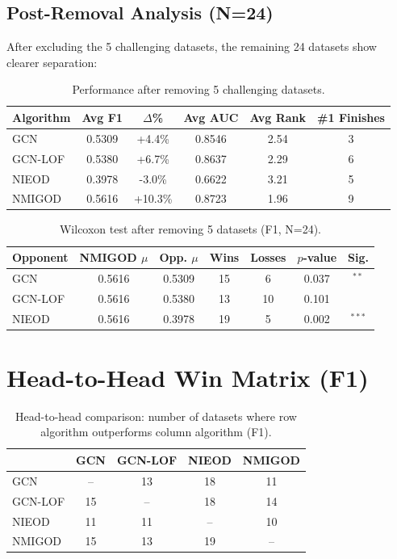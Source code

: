 \documentclass[11pt,a4paper]{article}
\begin{document}
\subsection{Post-Removal Analysis (N=24)}
After excluding the 5 challenging datasets, the remaining 24 datasets show clearer separation:
\begin{table}[H]\centering\caption{Performance after removing 5 challenging datasets.}\label{tab:filtered}\small
\begin{tabular}{lccccc}
\toprule
Algorithm & Avg F1 & $\Delta$\% & Avg AUC & Avg Rank & \#1 Finishes \\
\midrule
GCN & 0.5309 & +4.4\% & 0.8546 & 2.54 & 3 \\
GCN-LOF & 0.5380 & +6.7\% & 0.8637 & 2.29 & 6 \\
NIEOD & 0.3978 & -3.0\% & 0.6622 & 3.21 & 5 \\
NMIGOD & 0.5616 & +10.3\% & 0.8723 & 1.96 & 9 \\
\bottomrule\end{tabular}\end{table}
\begin{table}[H]\centering\caption{Wilcoxon test after removing 5 datasets (F1, N=24).}\label{tab:wilcoxon_filt}\small
\begin{tabular}{lcccccc}
\toprule
Opponent & NMIGOD $\mu$ & Opp. $\mu$ & Wins & Losses & $p$-value & Sig. \\
\midrule
GCN & 0.5616 & 0.5309 & 15 & 6 & 0.037 & $^{**}$ \\
GCN-LOF & 0.5616 & 0.5380 & 13 & 10 & 0.101 &  \\
NIEOD & 0.5616 & 0.3978 & 19 & 5 & 0.002 & $^{***}$ \\
\bottomrule\end{tabular}\end{table}

\section{Head-to-Head Win Matrix (F1)}
\begin{table}[H]\centering\caption{Head-to-head comparison: number of datasets where row algorithm outperforms column algorithm (F1).}\label{tab:h2h}\small
\begin{tabular}{l|cccc}
\toprule
 & GCN & GCN-LOF & NIEOD & NMIGOD \\
\midrule
GCN & -- & 13 & 18 & 11 \\
GCN-LOF & 15 & -- & 18 & 14 \\
NIEOD & 11 & 11 & -- & 10 \\
NMIGOD & 15 & 13 & 19 & -- \\
\bottomrule\end{tabular}\end{table}
\end{document}
